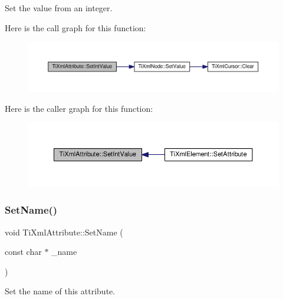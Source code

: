 Set the value from an integer. 

Here is the call graph for this function\+:
\nopagebreak
\begin{figure}[H]
\begin{center}
\leavevmode
\includegraphics[width=350pt]{class_ti_xml_attribute_a7e065df640116a62ea4f4b7da5449cc8_cgraph}
\end{center}
\end{figure}
Here is the caller graph for this function\+:
\nopagebreak
\begin{figure}[H]
\begin{center}
\leavevmode
\includegraphics[width=350pt]{class_ti_xml_attribute_a7e065df640116a62ea4f4b7da5449cc8_icgraph}
\end{center}
\end{figure}
\mbox{\label{class_ti_xml_attribute_ab7fa3d21ff8d7c5764cf9af15b667a99}} 
\subsubsection{\texorpdfstring{Set\+Name()}{SetName()}}
{\footnotesize\ttfamily void Ti\+Xml\+Attribute\+::\+Set\+Name (\begin{DoxyParamCaption}\item[{const char $\ast$}]{\+\_\+name }\end{DoxyParamCaption})\hspace{0.3cm}{\ttfamily [inline]}}



Set the name of this attribute. 

